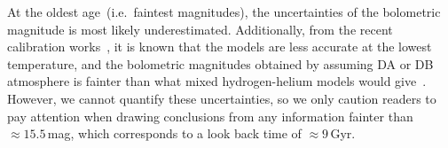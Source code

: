 \documentclass[fleqn,usenatbib]{mnras}
\begin{document}
At the oldest age~(i.e.\ faintest magnitudes), the uncertainties of the
bolometric magnitude is most likely underestimated. Additionally, from the 
recent calibration
works~\citep{2022ApJ...934...36B}, it is known that the models are less
accurate at the lowest  temperature, and the bolometric magnitudes obtained by
assuming DA or DB atmosphere is fainter than what mixed hydrogen-helium models
would give~\citep{2022ApJ...934...36B}. However, we cannot quantify these
uncertainties, so we only caution readers to pay attention when drawing conclusions
from any information fainter than $\approx15.5$\,mag, which corresponds to a
look back time of $\approx9$\,Gyr.

\end{document}
